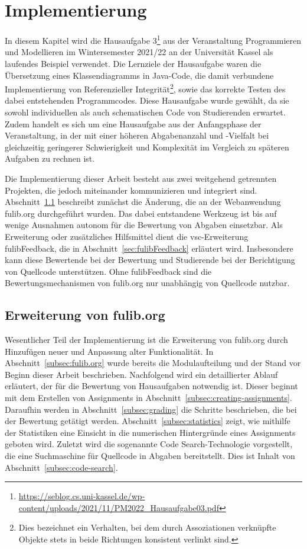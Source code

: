 \chapter{Implementierung}\label{ch:implementation}


In diesem Kapitel wird die Hausaufgabe 3\footnote{\url{https://seblog.cs.uni-kassel.de/wp-content/uploads/2021/11/PM2022_Hausaufgabe03.pdf}} aus der Veranstaltung Programmieren und Modellieren im Wintersemester 2021/22 an der Universität Kassel als laufendes Beispiel verwendet.
Die Lernziele der Hausaufgabe waren die Übersetzung eines Klassendiagramms in Java-Code, die damit verbundene Implementierung von Referenzieller Integrität\footnote{Dies bezeichnet ein Verhalten, bei dem durch Assoziationen verknüpfte Objekte stets in beide Richtungen konsistent verlinkt sind.}, sowie das korrekte Testen des dabei entstehenden Programmcodes.
Diese Hausaufgabe wurde gewählt, da sie sowohl individuellen als auch schematischen Code von Studierenden erwartet.
Zudem handelt es sich um eine Hausaufgabe aus der Anfangsphase der Veranstaltung, in der mit einer höheren Abgabenanzahl und -Vielfalt bei gleichzeitig geringerer Schwierigkeit und Komplexität im Vergleich zu späteren Aufgaben zu rechnen ist.

Die Implementierung dieser Arbeit besteht aus zwei weitgehend getrennten Projekten, die jedoch miteinander kommunizieren und integriert sind.
Abschnitt~\ref{sec:expanding-fulib.org} beschreibt zunächst die Änderung, die an der Webanwendung fulib.org durchgeführt wurden.
Das dabei entstandene Werkzeug ist bis auf wenige Ausnahmen autonom für die Bewertung von Abgaben einsetzbar.
Als Erweiterung oder zusätzliches Hilfsmittel dient die \ac{vsc}-Erweiterung fulibFeedback, die in Abschnitt~\ref{sec:fulibFeedback} erläutert wird.
Insbesondere kann diese Bewertende bei der Bewertung und Studierende bei der Berichtigung von Quellcode unterstützen.
Ohne fulibFeedback sind die Bewertungsmechanismen von fulib.org nur unabhängig von Quellcode nutzbar.

\section{Erweiterung von fulib.org}\label{sec:expanding-fulib.org}

Wesentlicher Teil der Implementierung ist die Erweiterung von fulib.org durch Hinzufügen neuer und Anpassung alter Funktionalität.
In Abschnitt~\ref{subsec:fulib.org} wurde bereits die Modulaufteilung und der Stand vor Beginn dieser Arbeit beschrieben.
Nachfolgend wird ein detaillierter Ablauf erläutert, der für die Bewertung von Hausaufgaben notwendig ist.
Dieser beginnt mit dem Erstellen von Assignments in Abschnitt~\ref{subsec:creating-assignments}.
Daraufhin werden in Abschnitt~\ref{subsec:grading} die Schritte beschrieben, die bei der Bewertung getätigt werden.
Abschnitt~\ref{subsec:statistics} zeigt, wie mithilfe der Statistiken eine Einsicht in die numerischen Hintergründe eines Assignments geboten wird.
Zuletzt wird die sogenannte Code Search-Technologie vorgestellt, die eine Suchmaschine für Quellcode in Abgaben bereitstellt.
Dies ist Inhalt von Abschnitt~\ref{subsec:code-search}.

